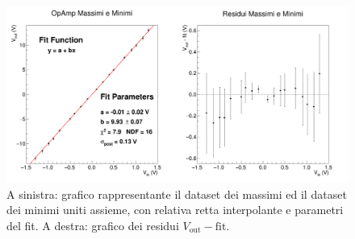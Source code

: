 \documentclass[a4paper,11pt]{article} %
\begin{document}
\begin{figure}[H]
	\centering
	\includegraphics[width=15cm]{../Plots/Report_Plots/opamp_plot_all_projected.png}
	\caption{\small A sinistra: grafico rappresentante il dataset dei massimi ed il dataset dei minimi uniti assieme, 
	con relativa retta interpolante e parametri del fit. A destra: grafico dei residui $V_{\text{out}}-\text{fit}$.}
	\label{i:opamp_all_proj}
\end{figure}
\end{document}
